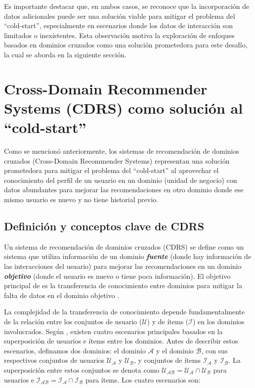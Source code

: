 		Es importante destacar que, en ambos casos, se reconoce que la incorporación de datos adicionales puede ser una solución viable para mitigar el problema del \enquote{cold-start}, especialmente en escenarios donde los datos de interacción son limitados o inexistentes. Esta observación motiva la exploración de enfoques basados en dominios cruzados como una solución prometedora para este desafío, la cual se aborda en la siguiente sección.

\section{Cross-Domain Recommender Systems (CDRS) como solución al \enquote{cold-start}}
		Como se mencionó anteriormente, los sistemas de recomendación de dominios cruzados (Cross-Domain Recommender Systems) representan una solución prometedora para mitigar el problema del \enquote{cold-start} al aprovechar el conocimiento del perfil de un usuario en un dominio (unidad de negocio) con datos abundantes para mejorar las recomendaciones en otro dominio donde ese mismo usuario es nuevo y no tiene historial previo.

	\subsection{Definición y conceptos clave de CDRS}
		Un sistema de recomendación de dominios cruzados (CDRS) se define como un sistema que utiliza información de un dominio \textbf{\textit{fuente}} (donde hay información de las interacciones del usuario) para mejorar las recomendaciones en un dominio \textbf{\textit{objetivo}} (donde el usuario es nuevo o tiene poca información). El objetivo principal de es la transferencia de conocimiento entre dominios para mitigar la falta de datos en el dominio objetivo \cite{10.1145/3548455,6137420}.

		La complejidad de la transferencia de conocimiento depende fundamentalmente de la relación entre los conjuntos de usuario ($\mathcal{U}$) y de ítems ($\mathcal{I}$) en los dominios involucrados. Según \cite{6137420}, existen cuatro escenarios principales basados en la superposición de usuarios e ítems entre los dominios. Antes de describir estos escenarios, definamos dos dominios: el dominio $\mathcal{A}$ y el dominio $\mathcal{B}$, con sus respectivos conjuntos de usuarios $\mathcal{U_{A}}$ y $\mathcal{U_{B}}$, y conjuntos de ítems $\mathcal{I_{A}}$ y $\mathcal{I_{B}}$. La superposición entre estos conjuntos se denota como $\mathcal{U_{AB}} = \mathcal{U_{A}} \cap \mathcal{U_{B}}$ para usuarios e $\mathcal{I_{AB}} = \mathcal{I_{A}} \cap \mathcal{I_{B}}$ para ítems. Los cuatro escenarios son:


